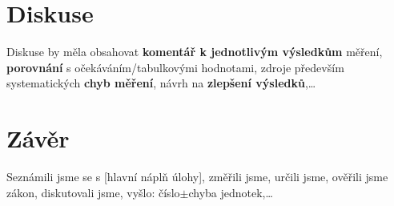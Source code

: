 	\section{Diskuse}
	Diskuse by měla obsahovat \textbf{komentář k jednotlivým výsledkům} měření, \textbf{porovnání} s očekáváním/tabulkovými hodnotami, zdroje především systematických \textbf{chyb měření}, návrh na \textbf{zlepšení výsledků},\dots
			

		

			
\section{Závěr}
		Seznámili jsme se s [hlavní náplň úlohy], změřili jsme, určili jsme, ověřili jsme zákon, diskutovali jsme, vyšlo: číslo$\pm$chyba jednotek,\dots
	



